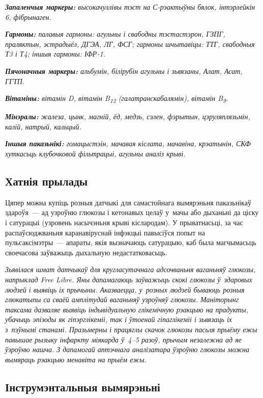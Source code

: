\emph{\textbf{Запаленчыя маркеры:} высокачуллівы тэст на С-рэактыўны бялок, інтэрлейкін 6, фібрынаген.}

\emph{\textbf{Гармоны:} палавыя гармоны: агульны і свабодны тэстастэрон, ГЗПГ, праляктын, эстрадыёл, ДГЭА, ЛГ, ФСГ; гармоны шчытавіцы: ТТГ, свабодныя Т3 і Т4; іншыя гармоны: ІФР-1.}

\emph{\textbf{Пячоначныя маркеры:} альбумін, білірубін агульны і зьвязаны, Алат, Асат, ГГТП.}

\emph{\textbf{Вітаміны:} вітамін D, вітамін B\textsubscript{12} (галатранскабалямін), вітамін B\textsubscript{9}.}

\emph{\textbf{Мінэралы:} жалеза, цынк, магній, ёд, медзь, сэлен, фэрытын, цэруляплязьмін, калій, натрый, кальцый.}

\emph{\textbf{Іншыя паказьнікі:} гомацыстэін, мачавая кіслата, мачавіна, крэатынін, СКФ хуткасьць клубочковой фільтрацыі, агульны аналіз крыві.}

\subsection*{Хатнія прылады}

Цяпер можна купіць розныя датчыкі для самастойнага вымярэньня паказьнікаў здароўя~--- ад узроўню глюкозы і кетонавых целаў у~мачы або дыханьні да ціску і сатурацыі (узровень насычэньня крыві кіслародам). У прыватнасьці, за час распаўсюджваньня каранавіруснай інфэкцыі павысіўся попыт на пульсаксімэтры~--- апараты, якія вызначаюць сатурацыю, каб была магчымасьць своечасова заўважыць дыхальную недастатковасьць.

\emph{Зьявілася шмат датчыкаў для кругласутачнага адсочваньня ваганьняў глюкозы, напрыклад Free Libre. Яны дапамагаюць заўважыць скокі глюкозы ў~здаровых людзей і выявіць іх прычыны. Аказваецца, у~розных людзей бываюць розныя глюкатыпы са сваёй амплітудай ваганьняў узроўняў глюкозы. Маніторынг таксама дазваляе выявіць індывідуальную глікемічную рэакцыю на прадукты, убачыць эпізоды як гіпэрглікеміі, так і ўтоенай гіпаглікеміі і зьвязаць іх з~пэўнымі станамі. Празьмерны і працяглы скачок глюкозы пасьля прыёму ежы павышае рызыку інфаркту міякарда ў~4--5 разоў, прычым незалежна ад яе ўзроўню нашча. З дапамогай аптэчнага аналізатара ўзроўню глюкозы можна вымяраць рэакцыю менавіта на прыём ежы.}

\subsection*{Інструмэнтальныя вымярэньні}

